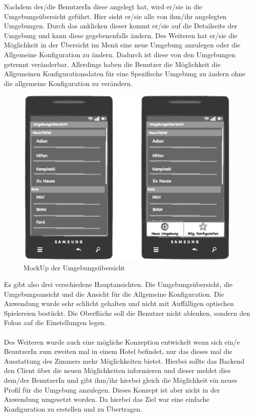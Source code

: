 Nachdem der/die BenutzerIn diese angelegt hat, wird er/sie in die Umgebungsübersicht geführt. Hier sieht er/sie alle von ihm/ihr angelegten Umgebungen. Durch das anklicken dieser kommt er/sie auf die Detailseite der Umgebung und kann diese gegebenenfalls ändern.       
Des Weiteren hat er/sie die Möglichkeit in der Übersicht im Menü eine neue Umgebung anzulegen oder die Allgemeine Konfiguration zu ändern. Dadurch ist diese von den Umgebungen getrennt veränderbar. Allerdings haben die Benutzer die Möglichkeit die Allgemeinen Konfigurationsdaten für eine Spezifische Umgebung zu ändern ohne die allgemeine Konfiguration zu verändern. 

\begin{figure}[H]
\includegraphics[width=12.5cm]{MockUps/Umgebung}
\caption{MockUp der Umgebungsübersicht}
\end{figure}

Es gibt also drei verschiedene Hauptansichten. Die Umgebungsübersicht, die Umgebungsansicht und die Ansicht für die Allgemeine Konfiguration. Die Anwendung wurde sehr schlicht gehalten und nicht mit Auffälligen optischen Spielereien bestückt. Die Oberfläche soll die Benutzer nicht ablenken, sondern den Fokus auf die Einstellungen legen. 
\\\\
Des Weiteren wurde auch eine mögliche Konzeption entwickelt wenn sich ein/e BenutzerIn zum zweiten mal in einem Hotel befindet, nur das dieses mal die Ausstattung des Zimmers mehr Möglichkeiten bietet. Hierbei sollte das Backend den Client über die neuen Möglichkeiten informieren und dieser meldet dies dem/der BenutzerIn und gibt ihm/ihr hierbei gleich die Möglichkeit ein neues Profil für die Umgebung anzulegen. Dieses Konzept ist aber nicht in der Anwendung umgesetzt worden. Da hierbei das Ziel war eine einfache Konfiguration zu erstellen und zu Übertragen.

